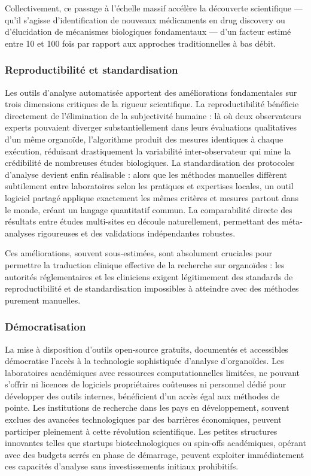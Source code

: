 Collectivement, ce passage à l'échelle massif accélère la découverte scientifique — qu'il s'agisse d'identification de nouveaux médicaments en drug discovery ou d'élucidation de mécanismes biologiques fondamentaux — d'un facteur estimé entre 10 et 100 fois par rapport aux approches traditionnelles à bas débit.

\subsubsection{Reproductibilité et standardisation}

Les outils d'analyse automatisée apportent des améliorations fondamentales sur trois dimensions critiques de la rigueur scientifique. La reproductibilité bénéficie directement de l'élimination de la subjectivité humaine : là où deux observateurs experts pouvaient diverger substantiellement dans leurs évaluations qualitatives d'un même organoïde, l'algorithme produit des mesures identiques à chaque exécution, réduisant drastiquement la variabilité inter-observateur qui mine la crédibilité de nombreuses études biologiques. La standardisation des protocoles d'analyse devient enfin réalisable : alors que les méthodes manuelles diffèrent subtilement entre laboratoires selon les pratiques et expertises locales, un outil logiciel partagé applique exactement les mêmes critères et mesures partout dans le monde, créant un langage quantitatif commun. La comparabilité directe des résultats entre études multi-sites en découle naturellement, permettant des méta-analyses rigoureuses et des validations indépendantes robustes.

Ces améliorations, souvent sous-estimées, sont absolument cruciales pour permettre la traduction clinique effective de la recherche sur organoïdes : les autorités réglementaires et les cliniciens exigent légitimement des standards de reproductibilité et de standardisation impossibles à atteindre avec des méthodes purement manuelles.

\subsubsection{Démocratisation}

La mise à disposition d'outils open-source gratuits, documentés et accessibles démocratise l'accès à la technologie sophistiquée d'analyse d'organoïdes. Les laboratoires académiques avec ressources computationnelles limitées, ne pouvant s'offrir ni licences de logiciels propriétaires coûteuses ni personnel dédié pour développer des outils internes, bénéficient d'un accès égal aux méthodes de pointe. Les institutions de recherche dans les pays en développement, souvent exclues des avancées technologiques par des barrières économiques, peuvent participer pleinement à cette révolution scientifique. Les petites structures innovantes telles que startups biotechnologiques ou spin-offs académiques, opérant avec des budgets serrés en phase de démarrage, peuvent exploiter immédiatement ces capacités d'analyse sans investissements initiaux prohibitifs.


